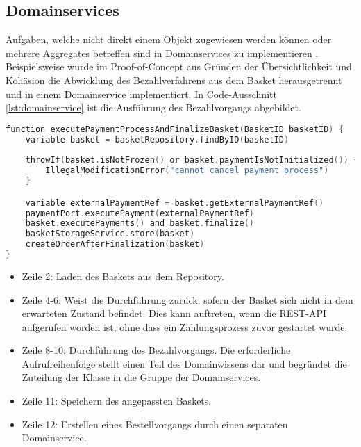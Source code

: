 \pagebreak

\subsection{Domainservices}

Aufgaben, welche nicht direkt einem Objekt zugewiesen werden können oder mehrere Aggregates betreffen sind in Domainservices zu implementieren \cite[S. 267]{Vernon.2015}. Beispielsweise wurde im Proof-of-Concept aus Gründen der Übersichtlichkeit und Kohäsion die Abwicklung des Bezahlverfahrens aus dem Basket herausgetrennt und in einem Domainservice implementiert. In Code-Ausschnitt \ref{lst:domainservice} ist die Ausführung des Bezahlvorgangs abgebildet. 

\vspace{0.5cm}
\begin{minipage}{\linewidth} %
	\begin{lstlisting}[caption={Ausführung des Bezahlvorgangs in einem Domainservice}, label={lst:domainservice}, language=Kotlin]
function executePaymentProcessAndFinalizeBasket(BasketID basketID) {
	variable basket = basketRepository.findByID(basketID)
	
	throwIf(basket.isNotFrozen() or basket.paymentIsNotInitialized()) {
		IllegalModificationError("cannot cancel payment process")
	}

	variable externalPaymentRef = basket.getExternalPaymentRef()
	paymentPort.executePayment(externalPaymentRef)
	basket.executePayments() and basket.finalize()
	basketStorageService.store(basket)
	createOrderAfterFinalization(basket)
}
	\end{lstlisting}
	\begin{itemize}
		\setlength\itemsep{-1pt}
		\item Zeile 2: Laden des Baskets aus dem Repository.
		\item Zeile 4-6: Weist die Durchführung zurück, sofern der Basket sich nicht in dem erwarteten Zustand befindet. Dies kann auftreten, wenn die REST-API aufgerufen worden ist, ohne dass ein Zahlungsprozess zuvor gestartet wurde.
		\item Zeile 8-10: Durchführung des Bezahlvorgangs. Die erforderliche Aufrufreihenfolge stellt einen Teil des Domainwissens dar und begründet die Zuteilung der Klasse in die Gruppe der Domainservices.
		\item Zeile 11: Speichern des angepassten Baskets.
		\item Zeile 12: Erstellen eines Bestellvorgangs durch einen separaten Domainservice.
	\end{itemize}
\end{minipage}

